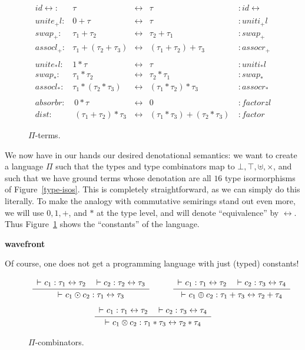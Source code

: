 \documentclass{article}
\newcommand{\identlp}{\mathit{unite}_+\mathit{l}}
\newcommand{\identrp}{\mathit{uniti}_+\mathit{l}}
\newcommand{\swapp}{\mathit{swap}_+}
\newcommand{\assoclp}{\mathit{assocl}_+}
\newcommand{\assocrp}{\mathit{assocr}_+}
\newcommand{\identlt}{\mathit{unite}_*\mathit{l}}
\newcommand{\identrt}{\mathit{uniti}_*\mathit{l}}
\newcommand{\swapt}{\mathit{swap}_*}
\newcommand{\assoclt}{\mathit{assocl}_*}
\newcommand{\assocrt}{\mathit{assocr}_*}
\newcommand{\factorzl}{\mathit{factorzl}}
\newcommand{\dist}{\mathit{dist}}
\newcommand{\factor}{\mathit{factor}}
\newcommand{\distz}{\mathit{absorbr}}
\newcommand{\iso}{\leftrightarrow}
\newcommand{\proves}{\vdash}
\newcommand{\idc}{\mathit{id}\!\!\leftrightarrow}
\newcommand{\Rule}[4]{
\makebox{{\rm #1}
$\displaystyle
\frac{\begin{array}{l}#2 \\\end{array}}
{\begin{array}{l}#3      \\\end{array}}$
 #4}}
\newcommand{\jdg}[3]{#2 \proves_{#1} #3}
\newcommand{\jc}[1]{\fbox{Jacques says:} \textbf{#1}}
\begin{document}
\begin{figure}[t]
\[
\begin{array}{rrcll}
\idc :& \tau & \iso & \tau &: \idc \\
\\
\identlp :&  0 + \tau & \iso & \tau &: \identrp \\
\swapp :&  \tau_1 + \tau_2 & \iso & \tau_2 + \tau_1 &: \swapp \\
\assoclp :&  \tau_1 + (\tau_2 + \tau_3) & \iso & (\tau_1 + \tau_2) + \tau_3 &: \assocrp \\
\\
\identlt :&  1 * \tau & \iso & \tau &: \identrt \\
\swapt :&  \tau_1 * \tau_2 & \iso & \tau_2 * \tau_1 &: \swapt \\
\assoclt :&  \tau_1 * (\tau_2 * \tau_3) & \iso & (\tau_1 * \tau_2) * \tau_3 &: \assocrt \\
\\
\distz :&~ 0 * \tau & \iso & 0 ~ &: \factorzl \\
\dist :&~ (\tau_1 + \tau_2) * \tau_3 & \iso & (\tau_1 * \tau_3) + (\tau_2 * \tau_3)~ &: \factor
\end{array}
\]
\caption{$\Pi$-terms.}
\label{pi-terms}
\end{figure}

We now have in our hands our desired denotational semantics: we want
to create a language $\Pi$ such that the types and type combinators
map to $\bot, \top, \uplus, \times$, and such that we have ground
terms whose denotation are all $16$ type isormorphisms of
Figure~\ref{type-isos}. This is completely straightforward, as
we can simply do this literally. To make the analogy with 
commutative semirings stand out even more, we will use $0, 1, +$, and $*$
at the type level, and will denote ``equivalence'' by $\iso$.
Thus Figure~\ref{pi-terms} shows the ``constants'' of the language.

\jc{wavefront}

Of course, one does not get a programming language with just (typed)
constants!

\begin{figure}[t]
\[
\Rule{}
{\jdg{}{}{c_1 : \tau_1 \iso \tau_2} \quad \vdash c_2 : \tau_2 \iso \tau_3}
{\jdg{}{}{c_1 \odot c_2 : \tau_1 \iso \tau_3}}
{}
\qquad
\Rule{}
{\jdg{}{}{c_1 : \tau_1 \iso \tau_2} \quad \vdash c_2 : \tau_3 \iso \tau_4}
{\jdg{}{}{c_1 \oplus c_2 : \tau_1 + \tau_3 \iso \tau_2 + \tau_4}}
{}
\]
\[
\Rule{}
{\jdg{}{}{c_1 : \tau_1 \iso \tau_2} \quad \vdash c_2 : \tau_3 \iso \tau_4}
{\jdg{}{}{c_1 \otimes c_2 : \tau_1 * \tau_3 \iso \tau_2 * \tau_4}}
{}
\]
\caption{$\Pi$-combinators.}
\label{pi-combinators}
\end{figure}
\end{document}
